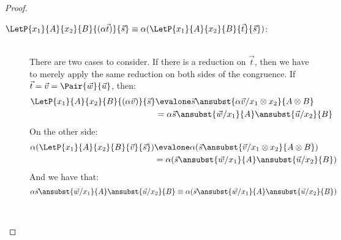 \begin{proof}
\begin{description}
    \item[$\LetP{x_1}{A}{x_2}{B}{(\alpha \vec{t})}{\vec{s}}\equiv\alpha(\LetP{x_1}{A}{x_2}{B}{\vec{t}}{\vec{s}})$:] \hfill\\
    There are two cases to consider. If there is a reduction on $\vec{t}$, then we have to merely apply the same reduction on both sides of the congruence. If $\vec{t}=\vec{v}=\Pair{\vec{w}}{\vec{u}}$, then:
    \begin{align*}
      \LetP{x_1}{A}{x_2}{B}{(\alpha\vec{v})}{\vec{s}}&\evalone\vec{s}\ansubst{\alpha\vec{v}/ x_1\otimes x_2}{A\otimes B}\\
      &= \alpha \vec{s}\ansubst{\vec{w}/ x_1}{A}\ansubst{\vec{u}/ x_2}{B}
    \end{align*}
    On the other side:
    \begin{align*}
      \alpha(\LetP{x_1}{A}{x_2}{B}{\vec{v}}{\vec{s}})&\evalone
      \alpha (\vec{s}\ansubst{\vec{v}/ x_1\otimes x_2}{A\otimes B})\\
      &=\alpha(\vec{s}\ansubst{\vec{w}/ x_1}{A}\ansubst{\vec{u}/ x_2}{B})
    \end{align*}
    And we have that:
    \[
      \alpha\vec{s}\ansubst{\vec{w}/ x_1}{A}\ansubst{\vec{u}/ x_2}{B}\equiv \alpha(\vec{s}\ansubst{\vec{w}/ x_1}{A}\ansubst{\vec{u}/ x_2}{B})
    \]
    
    \item[\parbox{\linewidth}{\begin{align*}
    &\LetP{x_1}{A}{x_2}{B}{\vec{t}+\vec{s}}{\vec{r}}\equiv\\
    &(\LetP{x_1}{A}{x_2}{B}{\vec{t}}{\vec{r}}) +
    (\LetP{x_1}{A}{x_2}{B}{\vec{s}}{\vec{r}})
    \end{align*}}:]\hfill\\
    

\end{description}
\end{proof}
